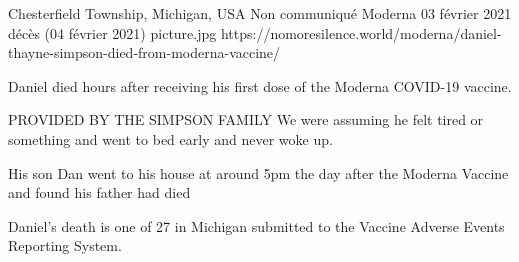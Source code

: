           {Chesterfield Township, Michigan, USA}
          {Non communiqué}
          {Moderna}
          {03 février 2021}
          {décès (04 février 2021)}
          {picture.jpg}
          {https://nomoresilence.world/moderna/daniel-thayne-simpson-died-from-moderna-vaccine/}
          {

Daniel died hours after receiving his first dose of the Moderna COVID-19
vaccine.

PROVIDED BY THE SIMPSON FAMILY We were assuming he felt tired or something and
went to bed early and never woke up.

His son Dan went to his house at around 5pm the day after the Moderna Vaccine
and found his father had died

Daniel’s death is one of 27 in Michigan submitted to the Vaccine Adverse Events
Reporting System.

}
